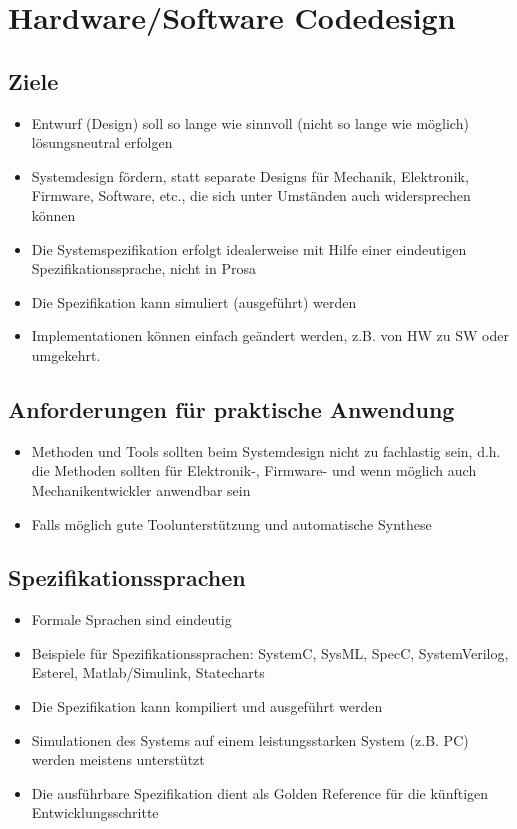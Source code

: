 \section{Hardware/Software Codedesign}
\subsection{Ziele}
	\begin{itemize}
		\item Entwurf (Design) soll so lange wie sinnvoll (nicht so lange wie möglich) lösungsneutral erfolgen
		\item Systemdesign fördern, statt separate Designs für Mechanik, Elektronik, Firmware, Software, etc., die sich unter Umständen auch widersprechen können
		\item Die Systemspezifikation erfolgt idealerweise mit Hilfe einer eindeutigen Spezifikationssprache, nicht in Prosa
		\item Die Spezifikation kann simuliert (ausgeführt) werden
		\item Implementationen können einfach geändert werden, z.B. von HW zu SW oder umgekehrt.
	\end{itemize}

\subsection{Anforderungen für praktische Anwendung}
	\begin{itemize}
		\item Methoden und Tools sollten beim Systemdesign nicht zu fachlastig sein, d.h. die Methoden sollten für Elektronik-, Firmware- und wenn möglich auch Mechanikentwickler anwendbar sein
		\item Falls möglich gute Toolunterstützung und automatische Synthese
	\end{itemize}

\subsection{Spezifikationssprachen}
	\begin{itemize}
		\item Formale Sprachen sind eindeutig
		\item Beispiele für Spezifikationssprachen: SystemC, SysML, SpecC, SystemVerilog, Esterel, Matlab/Simulink, Statecharts
		\item Die Spezifikation kann kompiliert und ausgeführt werden
		\item Simulationen des Systems auf einem leistungsstarken System (z.B. PC) werden meistens unterstützt
		\item Die ausführbare Spezifikation dient als Golden Reference für die künftigen Entwicklungsschritte
	\end{itemize}

